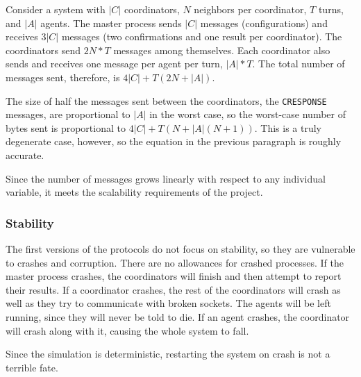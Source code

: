 Consider a system with $|C|$ coordinators, $N$ neighbors per coordinator, $T$ turns, and $|A|$ agents. The master process sends $|C|$ messages (configurations) and receives $3|C|$ messages (two confirmations and one result per coordinator). The coordinators send $2N*T$ messages among themselves. Each coordinator also sends and receives one message per agent per turn, $|A|*T$. The total number of messages sent, therefore, is $4|C|+T(2N+|A|)$.

The size of half the messages sent between the coordinators, the \texttt{CRESPONSE} messages, are proportional to $|A|$ in the worst case, so the worst-case number of bytes sent is proportional to $4|C|+T(N+|A|(N+1))$. This is a truly degenerate case, however, so the equation in the previous paragraph is roughly accurate.

Since the number of messages grows linearly with respect to any individual variable, it meets the scalability requirements of the project.

\subsubsection{Stability}

The first versions of the protocols do not focus on stability, so they are vulnerable to crashes and corruption. There are no allowances for crashed processes. If the master process crashes, the coordinators will finish and then attempt to report their results. If a coordinator crashes, the rest of the coordinators will crash as well as they try to communicate with broken sockets. The agents will be left running, since they will never be told to die. If an agent crashes, the coordinator will crash along with it, causing the whole system to fall.

Since the simulation is deterministic, restarting the system on crash is not a terrible fate.
